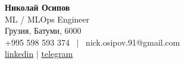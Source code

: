 \documentclass[letterpaper,12pt,english,russian]{fed-res} %
\begin{document}
\begin{center}
    \textbf{\Huge Николай Осипов} \\ \vspace{1pt}
    ML / MLOps Engineer \\ \vspace{1pt}
    Грузия, Батуми, 6000 \\ \vspace{1pt}
    +995 598 593 374 \ $|$ \ nick.osipov.91@gmail.com \\ \vspace{1pt}
    \href{https://www.linkedin.com/in/nickosipov/}{linkedin} $|$ 
    \href{https://t.me/NickOsipov}{telegram} \\ \vspace{1pt}
\end{center}







\end{document}
